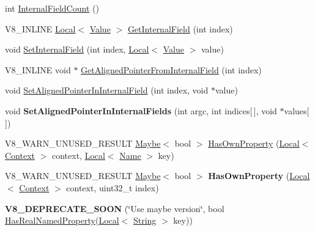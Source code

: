 \begin{DoxyCompactItemize}
\item 
int \mbox{\hyperlink{classv8_1_1Object_aaec28576353eebe6fee113bce2718ecc}{Internal\+Field\+Count}} ()
\item 
V8\+\_\+\+I\+N\+L\+I\+NE \mbox{\hyperlink{classv8_1_1Local}{Local}}$<$ \mbox{\hyperlink{classv8_1_1Value}{Value}} $>$ \mbox{\hyperlink{classv8_1_1Object_aa3324fdf652d8ac3b2f27faa0559231d}{Get\+Internal\+Field}} (int index)
\item 
void \mbox{\hyperlink{classv8_1_1Object_aebf949a0592cebc144bb2f96bfb7ec72}{Set\+Internal\+Field}} (int index, \mbox{\hyperlink{classv8_1_1Local}{Local}}$<$ \mbox{\hyperlink{classv8_1_1Value}{Value}} $>$ value)
\item 
V8\+\_\+\+I\+N\+L\+I\+NE void $\ast$ \mbox{\hyperlink{classv8_1_1Object_a435f68bb7ef0f64dd522c5c910682448}{Get\+Aligned\+Pointer\+From\+Internal\+Field}} (int index)
\item 
void \mbox{\hyperlink{classv8_1_1Object_a0ccba69581f0b5e4e672bab90f26879b}{Set\+Aligned\+Pointer\+In\+Internal\+Field}} (int index, void $\ast$value)
\item 
\mbox{\label{classv8_1_1Object_af03a2f9b898b578048b9e1c313f28100}} 
void {\bfseries Set\+Aligned\+Pointer\+In\+Internal\+Fields} (int argc, int indices\mbox{[}$\,$\mbox{]}, void $\ast$values\mbox{[}$\,$\mbox{]})
\item 
V8\+\_\+\+W\+A\+R\+N\+\_\+\+U\+N\+U\+S\+E\+D\+\_\+\+R\+E\+S\+U\+LT \mbox{\hyperlink{classv8_1_1Maybe}{Maybe}}$<$ bool $>$ \mbox{\hyperlink{classv8_1_1Object_acdd3921e95d5bb1a27cea489792607ff}{Has\+Own\+Property}} (\mbox{\hyperlink{classv8_1_1Local}{Local}}$<$ \mbox{\hyperlink{classv8_1_1Context}{Context}} $>$ context, \mbox{\hyperlink{classv8_1_1Local}{Local}}$<$ \mbox{\hyperlink{classv8_1_1Name}{Name}} $>$ key)
\item 
\mbox{\label{classv8_1_1Object_a939ec489799f022f0532835be8355774}} 
V8\+\_\+\+W\+A\+R\+N\+\_\+\+U\+N\+U\+S\+E\+D\+\_\+\+R\+E\+S\+U\+LT \mbox{\hyperlink{classv8_1_1Maybe}{Maybe}}$<$ bool $>$ {\bfseries Has\+Own\+Property} (\mbox{\hyperlink{classv8_1_1Local}{Local}}$<$ \mbox{\hyperlink{classv8_1_1Context}{Context}} $>$ context, uint32\+\_\+t index)
\item 
\mbox{\label{classv8_1_1Object_abf24b52a108c801a74718e1a1e64ba5b}} 
{\bfseries V8\+\_\+\+D\+E\+P\+R\+E\+C\+A\+T\+E\+\_\+\+S\+O\+ON} (\char`\"{}Use maybe version\char`\"{}, bool \mbox{\hyperlink{classv8_1_1Object_ad830b937c7586fe2086b288ea79935c4}{Has\+Real\+Named\+Property}}(\mbox{\hyperlink{classv8_1_1Local}{Local}}$<$ \mbox{\hyperlink{classv8_1_1String}{String}} $>$ key))

\end{DoxyCompactItemize}
